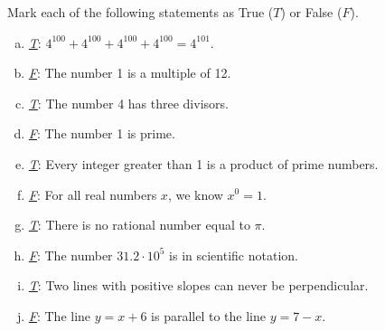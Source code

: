 \documentclass[12pt,letterpaper]{exam}
\begin{document}
\examtitle
{} 
\scores
\newpage

\begin{questions}

\question[10] Mark each  of the following statements as True ($T$) or False ($F$). \pspace
\begin{enumerate}[(a)]
\item \underline{\itshape\hspace{0.6cm}T\hspace{0.6cm}}: $4^{100} + 4^{100} + 4^{100} + 4^{100}= 4^{101}$. \vfill
\item \underline{\itshape\hspace{0.65cm}F\hspace{0.65cm}}: The number 1 is a multiple of 12. \vfill
\item \underline{\itshape\hspace{0.6cm}T\hspace{0.6cm}}: The number 4 has three divisors. \vfill
\item \underline{\itshape\hspace{0.65cm}F\hspace{0.65cm}}: The number 1 is prime. \vfill
\item \underline{\itshape\hspace{0.6cm}T\hspace{0.6cm}}: Every integer greater than 1 is a product of prime numbers. \vfill
\item \underline{\itshape\hspace{0.65cm}F\hspace{0.65cm}}: For all real numbers $x$, we know $x^0= 1$. \vfill
\item \underline{\itshape\hspace{0.6cm}T\hspace{0.6cm}}: There is no rational number equal to $\pi$. \vfill
\item \underline{\itshape\hspace{0.65cm}F\hspace{0.65cm}}: The number $31.2 \cdot 10^5$ is in scientific notation. \vfill
\item \underline{\itshape\hspace{0.6cm}T\hspace{0.6cm}}: Two lines with positive slopes can never be perpendicular. \vfill
\item \underline{\itshape\hspace{0.65cm}F\hspace{0.65cm}}: The line $y= x + 6$ is parallel to the line $y= 7 - x$. \vfill
\end{enumerate}




\end{questions}
\end{document}
